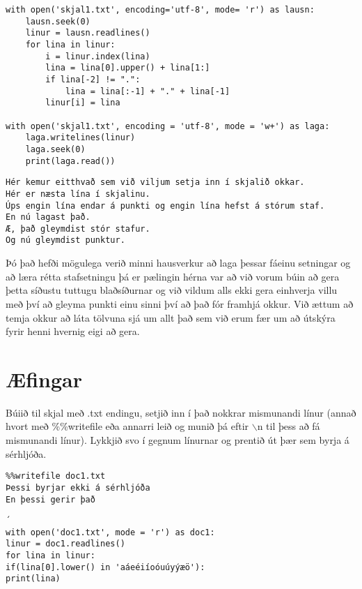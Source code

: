 \begin{lstlisting}[caption=Leysum punkta og hástafa vandann okkar, label=lst:skjalavinnsla-lausn]
with open('skjal1.txt', encoding='utf-8', mode= 'r') as lausn:
	lausn.seek(0)
	linur = lausn.readlines()
	for lina in linur:
		i = linur.index(lina)
		lina = lina[0].upper() + lina[1:]
		if lina[-2] != ".":
			lina = lina[:-1] + "." + lina[-1]
		linur[i] = lina

with open('skjal1.txt', encoding = 'utf-8', mode = 'w+') as laga:
	laga.writelines(linur)
	laga.seek(0)
	print(laga.read())
\end{lstlisting}
\lstset{style=uttak}
\begin{lstlisting}
Hér kemur eitthvað sem við viljum setja inn í skjalið okkar.
Hér er næsta lína í skjalinu.
Úps engin lína endar á punkti og engin lína hefst á stórum staf.
En nú lagast það.
Æ, það gleymdist stór stafur.
Og nú gleymdist punktur.
\end{lstlisting}
\lstset{style=venjulegt}

Þó það hefði mögulega verið minni hausverkur að laga þessar fáeinu setningar og að læra rétta stafsetningu þá er pælingin hérna var að við vorum búin að gera þetta síðustu tuttugu blaðsíðurnar og við vildum alls ekki gera einhverja villu með því að gleyma punkti einu sinni því að það fór framhjá okkur.
Við ættum að temja okkur að láta tölvuna sjá um allt það sem við erum fær um að útskýra fyrir henni hvernig eigi að gera.

\newpage
\section{Æfingar}

\begin{exercise}\label{doc1}
Búiið til skjal með .txt endingu, setjið inn í það nokkrar mismunandi línur (annað hvort með \%\%writefile eða annarri leið og munið þá eftir $\backslash$n til þess að fá mismunandi línur).
Lykkjið svo í gegnum línurnar og prentið út þær sem byrja á sérhljóða.
\end{exercise}
\begin{Answer}[ref={doc1}]

	\begin{lstlisting}
%%writefile doc1.txt
Þessi byrjar ekki á sérhljóða
En þessi gerir það
\end{lstlisting}
\begin{lstlisting}´
with open('doc1.txt', mode = 'r') as doc1:
linur = doc1.readlines()
for lina in linur:
if(lina[0].lower() in 'aáeéiíoóuúyýæö'):
print(lina)\end{lstlisting}
\end{Answer}


